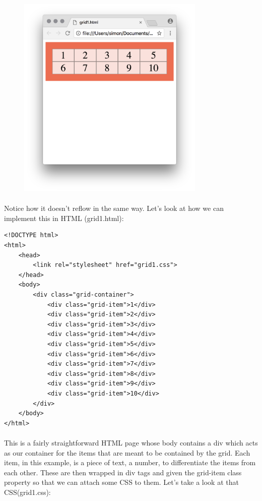 \begin{figure}[H]
\centering
\includegraphics[width=0.8\textwidth]{figures/grid-narrow}
\label{fig:grid-narrow}
\caption{}
\end{figure}


\paragraph{} Notice how it doesn't reflow in the same way. Let's look at how we can implement this in HTML (grid1.html):

\begin{lstlisting}
<!DOCTYPE html>
<html>
	<head>
		<link rel="stylesheet" href="grid1.css">
	</head>
	<body>
		<div class="grid-container">
  			<div class="grid-item">1</div>
  			<div class="grid-item">2</div>
  			<div class="grid-item">3</div>  
  			<div class="grid-item">4</div>
  			<div class="grid-item">5</div>
  			<div class="grid-item">6</div>  
  			<div class="grid-item">7</div>
  			<div class="grid-item">8</div>
  			<div class="grid-item">9</div>
  			<div class="grid-item">10</div> 
		</div>
	</body>
</html>
\end{lstlisting}

\paragraph{} This is a fairly straightforward HTML page whose body contains a div which acts as our container for the items that are meant to be contained by the grid. Each item, in this example, is a piece of text, a number, to differentiate the items from each other. These are then wrapped in div tags and given the grid-item class property so that we can attach some CSS to them. Let's take a look at that CSS(grid1.css):


